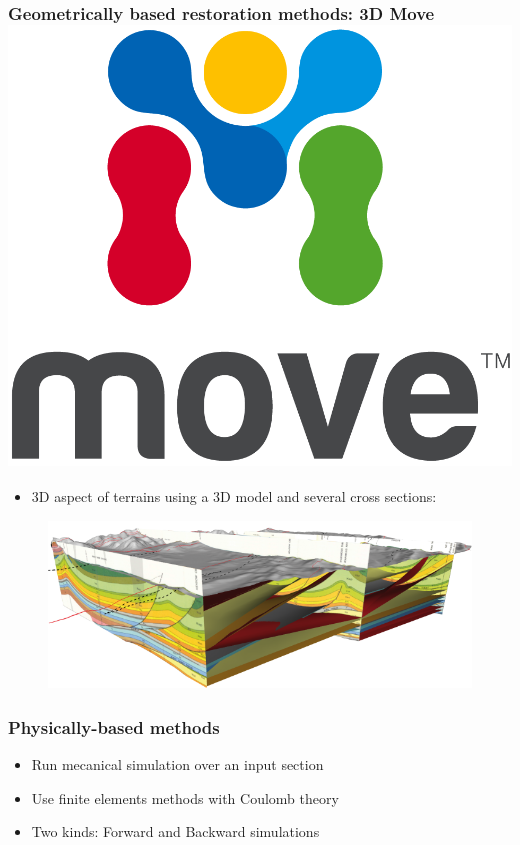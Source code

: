 \documentclass{beamer}
\begin{document}
     \begin{frame}
	\frametitle{Geometrically based restoration methods: 3D Move 
  \includegraphics[scale=0.13]{Move_logo_-01.png}}
	 \begin{itemize}
	 \item 3D aspect of terrains using a 3D model and several cross sections:
	 \end{itemize}
	 \begin{figure}[H]
	\centering
	\includegraphics[scale=1.7]{mve3D.png}
	\label{mve3}
	\end{figure}
    \end{frame}   
    
	\begin{frame}
	\frametitle{Physically-based methods}
	\begin{itemize}
	\item Run mecanical simulation over an input section
	\item Use finite elements methods with Coulomb theory
	\item Two kinds: Forward and Backward simulations
	\end{itemize}
    \end{frame}    
    
\end{document}
